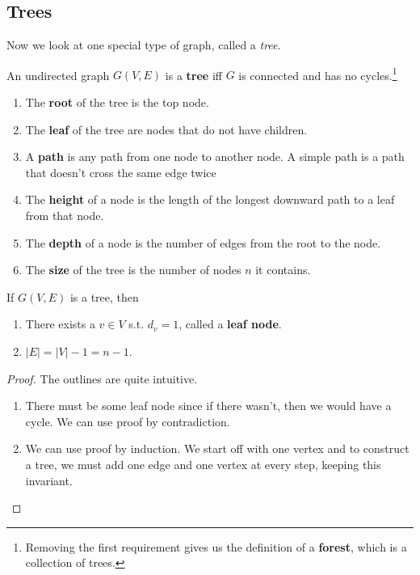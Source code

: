 \subsection{Trees} 

  Now we look at one special type of graph, called a \textit{tree}. 

  \begin{definition}[Tree]
		\label{def:tree}
    An undirected graph $G(V, E)$ is a \textbf{tree} iff $G$ is connected and has no cycles.\footnote{ Removing the first requirement gives us the definition of a \textbf{forest}, which is a collection of trees. }
    \begin{enumerate}
      \item The \textbf{root} of the tree is the top node. 
      \item The \textbf{leaf} of the tree are nodes that do not have children. 
      \item A \textbf{path} is any path from one node to another node. A simple path is a path that doesn't cross the same edge twice 
      \item The \textbf{height} of a node is the length of the longest downward path to a leaf from that node. 
      \item The \textbf{depth} of a node is the number of edges from the root to the node. 
      \item The \textbf{size} of the tree is the number of nodes $n$ it contains. 
    \end{enumerate}
  \end{definition}

  \begin{theorem}
    \label{thm:properties-of-trees}
    If $G(V, E)$ is a tree, then 
    \begin{enumerate}
      \item There exists a $v \in V$ s.t. $d_v = 1$, called a \textbf{leaf node}. 
      \item $|E| = |V| - 1 = n - 1$. 
    \end{enumerate}
  \end{theorem}
  \begin{proof}
    The outlines are quite intuitive. 
    \begin{enumerate}
      \item There must be some leaf node since if there wasn't, then we would have a cycle. We can use proof by contradiction. 
      \item We can use proof by induction. We start off with one vertex and to construct a tree, we must add one edge and one vertex at every step, keeping this invariant.  
    \end{enumerate}
  \end{proof} 

